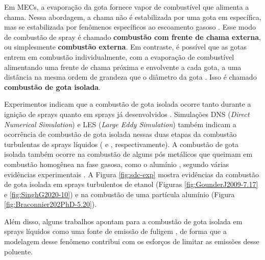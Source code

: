 Em MECs, a evaporação da gota fornece vapor de combustível que alimenta a chama.
Nessa abordagem, a chama não é estabilizada por uma gota em específica, mas se estabilizada por fenômenos específicos ao escoamento gasoso \cite{ChiuH1982,Law2006}.
Esse modo de combustão de spray é chamado \textbf{combustão com frente de chama externa}, ou simplesmente \textbf{combustão externa}.
Em contraste, é possível que as gotas entrem em combustão individualmente, com a evaporação de combustível alimentando uma frente de chama próxima e envolvente a cada gota, a uma distância na mesma ordem de grandeza que o diâmetro da gota \cite{ChiuH1977}.
Isso é chamado \textbf{combustão de gota isolada}.

Experimentos indicam que a combustão de gota isolada ocorre tanto durante a ignição	de sprays \cite{AggarwalS2014} quanto em sprays já desenvolvidos \cite{ChenG1996CF,SinghG2020,GounderJ2009PhD}.
Simulações DNS (\emph{Direct Numerical Simulation}) e LES (\emph{Large Eddy Simulation}) também indicam a ocorrência de combustão de gota isolada nessas duas etapas da combustão turbulentas de sprays líquidos (\cite{BorghesiG2013CF} e \cite{PaulhiacD2020,BojkoDesJardin2017CF}, respectivamente).
A combustão de gota isolada também ocorre na combustão de alguns pós metálicos que queimam em combustão homogênea na fase gasosa, como o alumínio \cite{Bergthorson2015,Julien2017,Baumann2020}, segundo várias evidências experimentais \cite{Braconnier2020Pre,Braconnier2022,Bucher1999,Halter2023}.
A Figura \ref{fig:sdc-exp} mostra evidências da combustão de gota isolada em sprays turbulentos de etanol (Figuras \ref{fig:GounderJ2009-7.17} e \ref{fig:SinghG2020-10}) e na combustão de uma partícula alumínio (Figura \ref{fig:Braconnier202PhD-5.20}). %

Além disso, alguns trabalhos apontam para a combustão de gota isolada em sprays líquidos como uma fonte de emissão de fuligem \cite[e referências 3-13 \emph{loc. cit.}]{FachiniF2005}, de forma que a modelagem desse fenômeno contribui com os esforços de limitar as emissões desse poluente.

